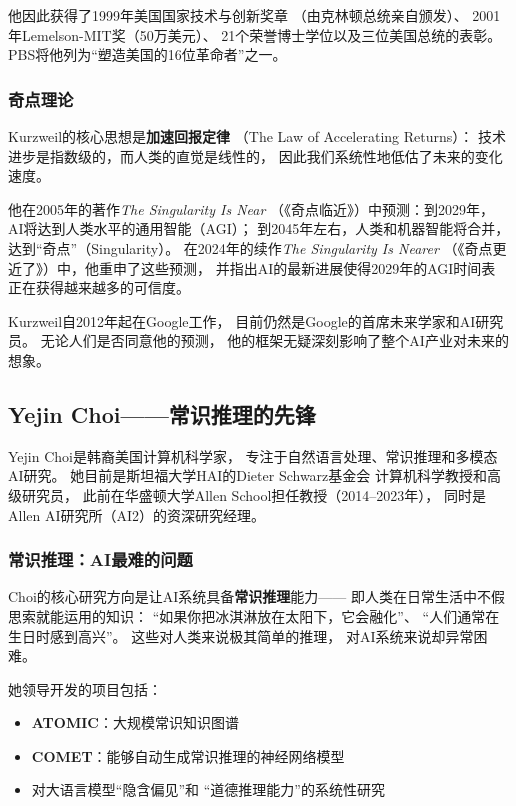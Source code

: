 他因此获得了1999年美国国家技术与创新奖章
（由克林顿总统亲自颁发）、
2001年Lemelson-MIT奖（50万美元）、
21个荣誉博士学位以及三位美国总统的表彰。
PBS将他列为``塑造美国的16位革命者''之一。

\subsubsection{奇点理论}
Kurzweil的核心思想是\textbf{加速回报定律}
（The Law of Accelerating Returns）：
技术进步是指数级的，而人类的直觉是线性的，
因此我们系统性地低估了未来的变化速度。

他在2005年的著作\textit{The Singularity Is Near}
（《奇点临近》）中预测：到2029年，
AI将达到人类水平的通用智能（AGI）；
到2045年左右，人类和机器智能将合并，
达到``奇点''（Singularity）。
在2024年的续作\textit{The Singularity Is Nearer}
（《奇点更近了》）中，他重申了这些预测，
并指出AI的最新进展使得2029年的AGI时间表
正在获得越来越多的可信度。

Kurzweil自2012年起在Google工作，
目前仍然是Google的首席未来学家和AI研究员。
无论人们是否同意他的预测，
他的框架无疑深刻影响了整个AI产业对未来的想象。

\bigskip

\subsection{Yejin Choi——常识推理的先锋}
\label{sec:yejin-choi}

Yejin Choi是韩裔美国计算机科学家，
专注于自然语言处理、常识推理和多模态AI研究。
她目前是斯坦福大学HAI的Dieter Schwarz基金会
计算机科学教授和高级研究员，
此前在华盛顿大学Allen School担任教授（2014--2023年），
同时是Allen AI研究所（AI2）的资深研究经理。

\subsubsection{常识推理：AI最难的问题}
Choi的核心研究方向是让AI系统具备\textbf{常识推理}能力——
即人类在日常生活中不假思索就能运用的知识：
``如果你把冰淇淋放在太阳下，它会融化''、
``人们通常在生日时感到高兴''。
这些对人类来说极其简单的推理，
对AI系统来说却异常困难。

她领导开发的项目包括：
\begin{itemize}[noitemsep]
  \item \textbf{ATOMIC}：大规模常识知识图谱
  \item \textbf{COMET}：能够自动生成常识推理的神经网络模型
  \item 对大语言模型``隐含偏见''和
    ``道德推理能力''的系统性研究
\end{itemize}

